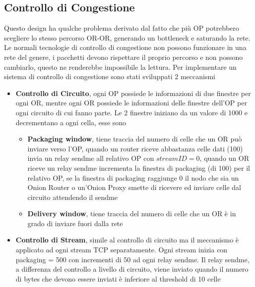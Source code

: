 \subsection{Controllo di Congestione} \label{sec:CongestionControl}
Questo design ha qualche problema derivato dal fatto che più OP potrebbero scegliere lo stesso percorso OR-OR, generando un bottleneck e saturando la rete. 
Le normali tecnologie di controllo di congestione non possono funzionare in una rete del genere, i pacchetti devono rispettare il proprio percorso e non possono cambiarlo, questo ne renderebbe impossibile la lettura. Per implementare un sistema di controllo di congestione sono stati sviluppati 2 meccanismi
\begin{itemize}
    \item \textbf{Controllo di Circuito}, ogni OP possiede le informazioni di due finestre per ogni OR, mentre ogni OR possiede le informazioni delle finestre dell'OP per ogni circuito di cui fanno parte. Le 2 finestre iniziano da un valore di 1000 e decrementano a ogni cella, esse sono
    \begin{itemize}
        \item \textbf{Packaging window}, tiene traccia del numero di celle che un OR può inviare verso l'OP, quando un router riceve abbastanza celle dati (100) invia un relay sendme all relativo OP con $streamID = 0$, quando un OR riceve un relay sendme incrementa la finestra di packaging (di 100) per il relativo OP, se la finestra di packaging raggiunge 0 il nodo che sia un Onion Router o un'Onion Proxy smette di ricevere ed inviare celle dal circuito attendendo il sendme
        \item \textbf{Delivery window}, tiene traccia del numero di celle che un OR è in grado di inviare fuori dalla rete
    \end{itemize}
    \item \textbf{Controllo di Stream}, simile al controllo di circuito ma il meccanismo è applicato ad ogni stream TCP separatamente. Ogni stream inizia con packaging = 500 con incrementi di 50 ad ogni relay sendme. Il relay sendme, a differenza del controllo a livello di circuito, viene inviato quando il numero di bytes che devono essere inviati è inferiore al threshold di 10 celle
\end{itemize}
\cite{onionv2}
